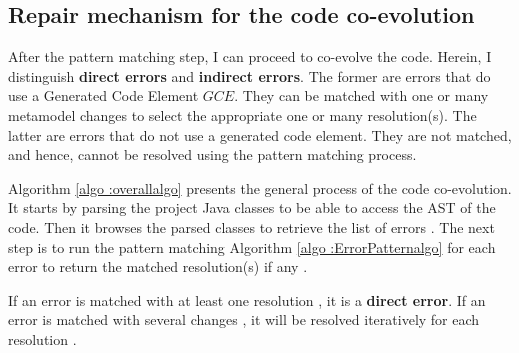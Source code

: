 \subsection{Repair mechanism for the code co-evolution}

\label{repairmechanism}


After the pattern matching step, I can proceed to co-evolve the code. 
Herein, I distinguish \textbf{direct errors} and \textbf{indirect errors}. The former are errors that do use a Generated Code Element $GCE$. They can be matched with one or many metamodel changes to select the appropriate one or many resolution(s). 
The latter are errors that %
do not use a generated code element. They are not matched, and hence, cannot be resolved using the pattern matching process. %



Algorithm \ref{algo :overallalgo} presents the general process of the code co-evolution. It starts by parsing the project Java classes {\small{}} to be able to access the AST of the code. Then it browses the parsed classes to retrieve the list of errors {\small{}}. 
The next step is to run the pattern matching Algorithm \ref{algo :ErrorPatternalgo} for each error to return the matched resolution(s) if any {\small{}}. 



%
%
%
If an error is matched with at least one resolution {\small{}}, it is a \textbf{direct error}. If an error is matched with several changes {\small{}}, it will be resolved iteratively for each resolution {\small{}}. 

